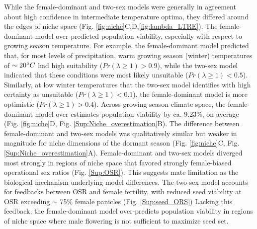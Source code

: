 \documentclass[12pt]{article}\usepackage[]{graphicx}\usepackage[dvipsnames]{xcolor}
\begin{document}
While the female-dominant and two-sex models were generally in agreement about high confidence in intermediate temperature optima, they differed around the edges of niche space (Fig. \ref{fig:niche}C,D,\ref{fig:lambda_LTRE}). 
The female-dominant model over-predicted population viability, especially with respect to growing season temperature. 
For example, the female-dominant model predicted that, for most levels of precipitation, warm growing season (winter) temperatures of $\sim 20\degree C$ had high suitability ($Pr(\lambda \ge 1) > 0.9$), while the two-sex model indicated that these conditions were most likely unsuitable ($Pr(\lambda \ge 1) < 0.5$). 
Similarly, at low winter temperatures that the two-sex model identifies with high certainty as unsuitable ($Pr(\lambda \ge 1) < 0.1$), the female-dominant model is more optimistic ($Pr(\lambda \ge 1) > 0.4$). 
Across growing season climate space, the female-dominant model over-estimates population viability by ca.  9.23\%, on average (Fig. \ref{fig:niche}D, Fig. \ref{Sup:Niche_overestimation}B). 
The difference between female-dominant and two-sex models was qualitatively similar but weaker in magnitude for niche dimensions of the dormant season (Fig. \ref{fig:niche}C, Fig. \ref{Sup:Niche_overestimation}A). 
Female-dominant and two-sex models diverged most strongly in regions of niche space that favored strongly female-biased operational sex ratios (Fig. \ref{Sup:OSR}). 
This suggests mate limitation as the biological mechanism underlying model differences. 
The two-sex model accounts for feedbacks between OSR and female fertility, with reduced seed viability at OSR exceeding $\sim$ 75\% female panicles (Fig. \ref{Sup:seed_ORS})
Lacking this feedback, the female-dominant model over-predicts population viability in regions of niche space where male flowering is not sufficient to maximize seed set. 
\end{document}
